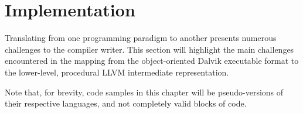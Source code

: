 \chapter{Implementation}
\label{chap:implementation}

Translating from one programming paradigm to another presents numerous challenges to the compiler writer. This section will highlight the main challenges encountered in the mapping from the object-oriented Dalvik executable format to the lower-level, procedural LLVM intermediate representation.

Note that, for brevity, code samples in this chapter will be pseudo-versions of their respective languages, and not completely valid blocks of code.














